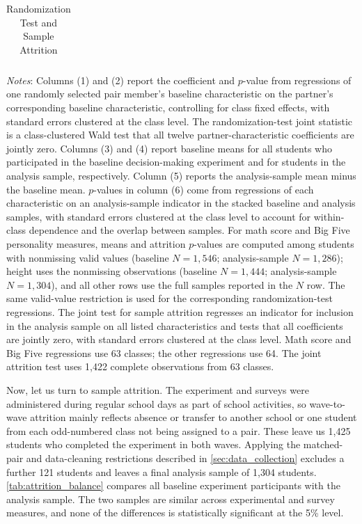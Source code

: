 \documentclass[11 pt]{article}
\begin{document}
\begin{table}[h!]
\centering
\caption{Randomization Test and Sample Attrition}
\label{tab:attrition_balance}
\begin{tabular}{lcccccc}
\toprule \hline

\end{tabular}
\begin{minipage}{\textwidth}
{\footnotesize \emph{Notes}: Columns (1) and (2) report the coefficient and $p$-value from regressions of one randomly selected pair member's baseline characteristic on the partner's corresponding baseline characteristic, controlling for class fixed effects, with standard errors clustered at the class level. The randomization-test joint statistic is a class-clustered Wald test that all twelve partner-characteristic coefficients are jointly zero. Columns (3) and (4) report baseline means for all students who participated in the baseline decision-making experiment and for students in the analysis sample, respectively. Column (5) reports the analysis-sample mean minus the baseline mean. $p$-values in column (6) come from regressions of each characteristic on an analysis-sample indicator in the stacked baseline and analysis samples, with standard errors clustered at the class level to account for within-class dependence and the overlap between samples. For math score and Big Five personality measures, means and attrition $p$-values are computed among students with nonmissing valid values (baseline $N=1,546$; analysis-sample $N=1,286$); height uses the nonmissing observations (baseline $N=1,444$; analysis-sample $N=1,304$), and all other rows use the full samples reported in the $N$ row. The same valid-value restriction is used for the corresponding randomization-test regressions. The joint test for sample attrition regresses an indicator for inclusion in the analysis sample on all listed characteristics and tests that all coefficients are jointly zero, with standard errors clustered at the class level. Math score and Big Five regressions use 63 classes; the other regressions use 64. The joint attrition test uses 1,422 complete observations from 63 classes.}
\end{minipage}
\end{table}


Now, let us turn to sample attrition. The experiment and surveys were administered during regular school days as part of school activities, so wave-to-wave attrition mainly reflects absence or transfer to another school or one student from each odd-numbered class not being assigned to a pair. These leave us 1,425 students who completed the experiment in both waves. Applying the matched-pair and data-cleaning restrictions described in \autoref{sec:data_collection} excludes a further 121 students and leaves a final analysis sample of 1,304 students. \autoref{tab:attrition_balance} compares all baseline experiment participants with the analysis sample. The two samples are similar across experimental and survey measures, and none of the differences is statistically significant at the 5\% level.
\end{document}
